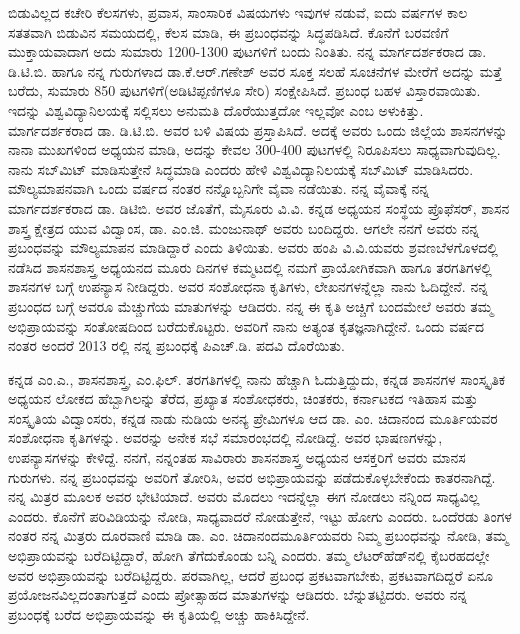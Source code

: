 ಬಿಡುವಿಲ್ಲದ ಕಚೇರಿ ಕೆಲಸಗಳು, ಪ್ರವಾಸ, ಸಾಂಸಾರಿಕ ವಿಷಯಗಳು ಇವುಗಳ ನಡುವೆ, ಐದು ವರ್ಷಗಳ ಕಾಲ ಸತತವಾಗಿ ಬಿಡುವಿನ ಸಮಯದಲ್ಲಿ, ಕೆಲಸ ಮಾಡಿ, ಈ ಪ್ರಬಂಧವನ್ನು ಸಿದ್ಧಪಡಿಸಿದೆ. ಕೊನೆಗೆ ಬರವಣಿಗೆ ಮುಕ್ತಾಯ\-ವಾದಾಗ ಅದು ಸುಮಾರು 1200-1300 ಪುಟಗಳಿಗೆ ಬಂದು ನಿಂತಿತು. ನನ್ನ ಮಾರ್ಗದರ್ಶಕರಾದ ಡಾ. ಡಿ.ಟಿ.ಬಿ. ಹಾಗೂ ನನ್ನ ಗುರುಗಳಾದ ಡಾ.ಕೆ.ಆರ್​.ಗಣೇಶ್​ ಅವರ ಸೂಕ್ತ ಸಲಹೆ ಸೂಚನೆಗಳ ಮೇರೆಗೆ ಅದನ್ನು ಮತ್ತೆ ಬರೆದು, ಸುಮಾರು 850 ಪುಟ\-ಗಳಿಗೆ(ಅಡಿಟಿಪ್ಪಣಿಗಳೂ ಸೇರಿ) ಸಂಕ್ಷೇಪಿಸಿದೆ. ಪ್ರಬಂಧ ಬಹಳ ವಿಸ್ತಾರವಾಯಿತು. ಇದನ್ನು ವಿಶ್ವವಿದ್ಯಾನಿಲಯಕ್ಕೆ ಸಲ್ಲಿಸಲು ಅನುಮತಿ ದೊರೆಯುತ್ತದೋ ಇಲ್ಲವೋ ಎಂಬ ಅಳುಕಿತ್ತು. ಮಾರ್ಗದರ್ಶಕರಾದ ಡಾ. ಡಿ.ಟಿ.ಬಿ. ಅವರ ಬಳಿ ವಿಷಯ ಪ್ರಸ್ತಾಪಿಸಿದೆ. ಅದಕ್ಕೆ ಅವರು ಒಂದು ಜಿಲ್ಲೆಯ ಶಾಸನಗಳನ್ನು ನಾನಾ ಮುಖಗಳಿಂದ ಅಧ್ಯಯನ ಮಾಡಿ, ಅದನ್ನು ಕೇವಲ 300-400 ಪುಟಗಳಲ್ಲಿ ನಿರೂಪಿಸಲು ಸಾಧ್ಯವಾಗುವುದಿಲ್ಲ. ನಾನು ಸಬ್​ಮಿಟ್​ ಮಾಡಿಸುತ್ತೇನೆ ಸಿದ್ಧಮಾಡಿ ಎಂದರು ಹೇಳಿ ವಿಶ್ವವಿದ್ಯಾನಿಲಯಕ್ಕೆ ಸಬ್​ಮಿಟ್​ ಮಾಡಿಸಿದರು. ಮೌಲ್ಯಮಾಪನವಾಗಿ ಒಂದು ವರ್ಷದ ನಂತರ ನನ್ನೊಬ್ಬನಿಗೇ ವೈವಾ ನಡೆಯಿತು. ನನ್ನ ವೈವಾಕ್ಕೆ ನನ್ನ ಮಾರ್ಗದರ್ಶಕರಾದ ಡಾ. ಡಿಟಿಬಿ. ಅವರ ಜೊತೆಗೆ, ಮೈಸೂರು ವಿ.ವಿ. ಕನ್ನಡ ಅಧ್ಯಯನ ಸಂಸ್ಥೆಯ ಪ್ರೊಫೆಸರ್​, ಶಾಸನ ಶಾಸ್ತ್ರ ಕ್ಷೇತ್ರದ ಯುವ ವಿದ್ವಾಂಸ, ಡಾ. ಎಂ.ಜಿ. ಮಂಜುನಾಥ್​ ಅವರು ಬಂದಿದ್ದರು. ಆಗಲೇ ನನಗೆ ಅವರು ನನ್ನ ಪ್ರಬಂಧವನ್ನು ಮೌಲ್ಯಮಾಪನ ಮಾಡಿದ್ದಾರೆ ಎಂದು ತಿಳಿಯಿತು. ಅವರು ಹಂಪಿ ವಿ.ವಿ.ಯವರು ಶ್ರವಣಬೆಳಗೊಳದಲ್ಲಿ ನಡೆಸಿದ ಶಾಸನಶಾಸ್ತ್ರ ಅಧ್ಯಯನದ ಮೂರು ದಿನಗಳ ಕಮ್ಮಟದಲ್ಲಿ ನಮಗೆ ಪ್ರಾಯೋಗಿಕವಾಗಿ ಹಾಗೂ ತರಗತಿಗಳಲ್ಲಿ ಶಾಸನಗಳ ಬಗ್ಗೆ ಉಪನ್ಯಾಸ ನೀಡಿದ್ದರು. ಅವರ ಸಂಶೋಧನಾ ಕೃತಿಗಳು, ಲೇಖನಗಳನ್ನೆಲ್ಲಾ ನಾನು ಓದಿದ್ದೇನೆ. ನನ್ನ ಪ್ರಬಂಧದ ಬಗ್ಗೆ ಅವರೂ ಮೆಚ್ಚುಗೆಯ ಮಾತುಗಳನ್ನು ಆಡಿದರು. ನನ್ನ ಈ ಕೃತಿ ಅಚ್ಚಿಗೆ ಬಂದಮೇಲೆ ಅವರು ತಮ್ಮ ಅಭಿಪ್ರಾಯವನ್ನು ಸಂತೋಷದಿಂದ ಬರೆದುಕೊಟ್ಟರು. ಅವರಿಗೆ ನಾನು ಅತ್ಯಂತ ಕೃತಜ್ಞನಾಗಿದ್ದೇನೆ. ಒಂದು ವರ್ಷದ ನಂತರ ಅಂದರೆ 2013 ರಲ್ಲಿ ನನ್ನ ಪ್ರಬಂಧಕ್ಕೆ ಪಿಎಚ್​.ಡಿ. ಪದವಿ ದೊರೆಯಿತು.

ಕನ್ನಡ ಎಂ.ಎ., ಶಾಸನಶಾಸ್ತ್ರ, ಎಂ.ಫಿಲ್​. ತರಗತಿಗಳಲ್ಲಿ ನಾನು ಹೆಚ್ಚಾಗಿ ಓದುತ್ತಿದ್ದುದು, ಕನ್ನಡ ಶಾಸನಗಳ ಸಾಂಸ್ಕೃತಿಕ ಅಧ್ಯಯನ ಲೋಕದ ಹೆಬ್ಬಾಗಿಲನ್ನು ತೆರೆದ, ಪ್ರಖ್ಯಾತ ಸಂಶೋಧಕರು, ಚಿಂತಕರು, ಕರ್ನಾಟಕದ ಇತಿಹಾಸ ಮತ್ತು ಸಂಸ್ಕೃತಿಯ ವಿದ್ವಾಂಸರು, ಕನ್ನಡ ನಾಡು ನುಡಿಯ ಅನನ್ಯ ಪ್ರೇಮಿಗಳೂ ಆದ ಡಾ. ಎಂ. ಚಿದಾನಂದ ಮೂರ್ತಿಯವರ ಸಂಶೋಧನಾ ಕೃತಿಗಳನ್ನು. ಅವರನ್ನು ಅನೇಕ ಸಭೆ ಸಮಾರಂಭದಲ್ಲಿ ನೋಡಿದ್ದೆ. ಅವರ ಭಾಷಣಗಳನ್ನು, ಉಪನ್ಯಾಸಗಳನ್ನು ಕೇಳಿದ್ದೆ. ನನಗೆ, ನನ್ನಂತಹ ಸಾವಿರಾರು ಶಾಸನಶಾಸ್ತ್ರ ಅಧ್ಯಯನ ಆಸಕ್ತರಿಗೆ ಅವರು ಮಾನಸ ಗುರುಗಳು. ನನ್ನ ಪ್ರಬಂಧವನ್ನು ಅವರಿಗೆ ತೋರಿಸಿ, ಅವರ ಅಭಿಪ್ರಾಯವನ್ನು ಪಡೆದುಕೊಳ್ಳಬೇಕೆಂದು ಕಾತರನಾಗಿದ್ದೆ. ನನ್ನ ಮಿತ್ರರ ಮೂಲಕ ಅವರ ಭೇಟಿ\-ಯಾದೆ. ಅವರು ಮೊದಲು ಇದನ್ನೆಲ್ಲಾ ಈಗ ನೋಡಲು ನನ್ನಿಂದ ಸಾಧ್ಯವಿಲ್ಲ ಎಂದರು. ಕೊನೆಗೆ ಪರಿವಿಡಿಯನ್ನು ನೋಡಿ, ಸಾಧ್ಯ\-ವಾದರೆ ನೋಡುತ್ತೇನೆ, ಇಟ್ಟು ಹೋಗು ಎಂದರು. ಒಂದೆರಡು ತಿಂಗಳ ನಂತರ ನನ್ನ ಮಿತ್ರರು ದೂರವಾಣಿ ಮಾಡಿ ಡಾ. ಎಂ. ಚಿದಾನಂದಮೂರ್ತಿಯವರು ನಿಮ್ಮ ಪ್ರಬಂಧವನ್ನು ನೋಡಿ, ತಮ್ಮ ಅಭಿಪ್ರಾಯವನ್ನು ಬರೆದಿಟ್ಟಿದ್ದಾರೆ, ಹೋಗಿ ತೆಗೆದುಕೊಂಡು ಬನ್ನಿ ಎಂದರು. ತಮ್ಮ ಲೆಟರ್​ಹೆಡ್​ನಲ್ಲಿ ಕೈಬರಹದಲ್ಲೇ ಅವರ ಅಭಿಪ್ರಾಯವನ್ನು ಬರೆದಿಟ್ಟಿದ್ದರು. ಪರವಾಗಿಲ್ಲ, ಆದರೆ ಪ್ರಬಂಧ ಪ್ರಕಟವಾಗಬೇಕು, ಪ್ರಕಟವಾಗದಿದ್ದರೆ ಏನೂ ಪ್ರಯೋಜನವಿಲ್ಲದಂತಾಗುತ್ತದೆ ಎಂದು ಪ್ರೋತ್ಸಾಹದ ಮಾತುಗಳನ್ನು ಆಡಿದರು. ಬೆನ್ನುತಟ್ಟಿದರು. ಅವರು ನನ್ನ ಪ್ರಬಂಧಕ್ಕೆ ಬರೆದ ಅಭಿಪ್ರಾಯವನ್ನು ಈ ಕೃತಿಯಲ್ಲಿ ಅಚ್ಚು ಹಾಕಿಸಿದ್ದೇನೆ.

